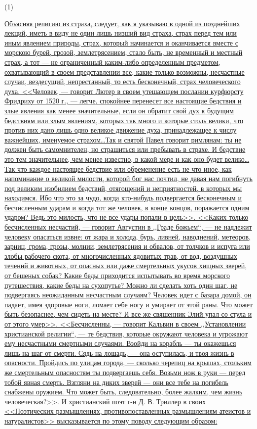 \documentclass[12pt]{article}
\begin{document}
\hypertarget{1}{(1)} \hyperlink{b1}{Объясняя религию из страха, следует, как я указываю в одной из позднейших лекций, иметь в виду не один лишь низший вид страха, страх перед тем или иным явлением природы, страх, который начинается и оканчивается вместе с морскою бурей, грозой, землетрясением, стало быть, не временный и местный страх, а тот --- не ограниченный каким-либо определенным предметом, охватывающий в своем представлении все, какие только возможны, несчастные случаи, вездесущий, непрестанный, то есть бесконечный, страх человеческого духа. <<Человек, --- говорит Лютер в своем утешающем послании курфюрсту Фридриху от 1520 г., --- легче, спокойнее перенесет все настоящие бедствия и злые явления как менее значительные, если он обратит свой дух к будущим бедствиям или злым явлениям, которых так много и которые столь велики, что против них дано лишь одно великое движение духа, принадлежащее к числу важнейших, именуемое страхом\dots Так и святой Павел говорит римлянам: ты не должен быть самомнителен, но страшиться или пребывать в страхе. И бедствие это тем значительнее, чем менее известно, в какой мере и как оно будет велико\dots Так что каждое настоящее бедствие или обременение есть не что иное, как напоминание о великой милости, которой бог нас почтил, не давая нам погибнуть под великим изобилием бедствий, отягощений и неприятностей, в которых мы находимся. Ибо что это за чудо, когда кто-нибудь подвергается бесконечным и бесчисленным ударам и когда тот же человек, в конце концов, поражается одним ударом? Ведь это милость, что не все удары попали в цель>>. <<Каких только бесчисленных несчастий, --- говорит Августин в ,,Граде божьем``, ---  не надлежит человеку опасаться извне: от жара и холода, бурь, ливней, наводнений, метеоров, зарниц, грома, грозы, молнии, землетрясения и обвалов, от толчков и испуга или злобы рабочего скота, от многочисленных ядовитых трав, от вод, воздушных течений и животных, от опасных или даже смертельных укусов хищных зверей, от бешеных собак? Какие беды приходится испытывать во время морского путешествия, какие беды на сухопутье? Можно ли сделать хоть один шаг, не подвергаясь неожиданным несчастным случаям? Человек идет с базара домой, он падает, имея здоровые ноги, ломает себе ногу и умирает от этой раны. Что может быть безопаснее, чем сидеть на месте? И все же священник Элий упал со стула и от этого умер>>. <<Бесчисленны, --- говорит Кальвин в своем ,,Установлении христианской религии``,  --- те бедствия, которые окружают человека и угрожают ему несчастными смертными случаями. Взойди на корабль --- ты окажешься лишь на шаг от смерти. Сядь на лошадь, --- она оступилась, и твоя жизнь в опасности. Пройдись по улицам города, --- сколько черепиц на крышах, стольким же смертельным опасностям ты подвергаешь себя. Возьми нож в руки --- перед тобой явная смерть. Взгляни на диких зверей --- они все тебе на погибель снабжены оружием. Что может быть, следовательно, более жалким, чем жизнь человеческая?>>. И христианский поэт г-н Д. В. Триллер в своих <<Поэтических размышлениях, противопоставленных размышлениям атеистов и натуралистов>> высказывается по этому поводу следующим образом: 
}
\end{document}

